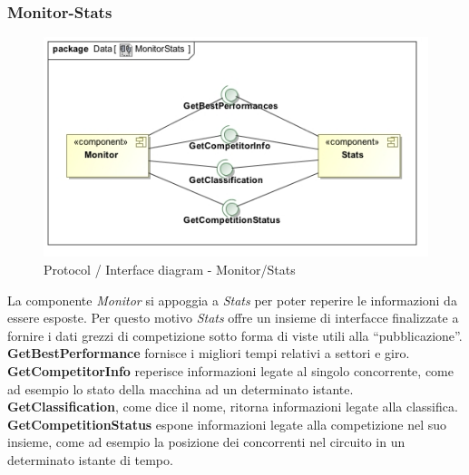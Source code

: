 \subsubsection{Monitor-Stats}
\begin{center}
\begin{figure}[h!]
	\includegraphics[scale=0.55]{img/InteractionDiagram/Implementation_Diagram__MonitorStats.jpg}
\caption{Protocol / Interface diagram - Monitor/Stats}
\end{figure}
\end{center}
La componente \emph{Monitor} si appoggia a \emph{Stats} per poter reperire le informazioni da essere esposte. Per questo motivo
\emph{Stats} offre un insieme di interfacce finalizzate a fornire i dati grezzi di competizione sotto forma di viste utili alla ``pubblicazione''.\\
\textbf{GetBestPerformance} fornisce i migliori tempi relativi a settori e giro.\\
\textbf{GetCompetitorInfo} reperisce informazioni legate al singolo concorrente, come ad esempio lo stato della macchina ad un determinato istante.\\
\textbf{GetClassification}, come dice il nome, ritorna informazioni legate alla classifica.\\
\textbf{GetCompetitionStatus} espone informazioni legate alla competizione nel suo insieme, come ad esempio la posizione dei concorrenti nel circuito
in un determinato istante di tempo.
\clearpage
